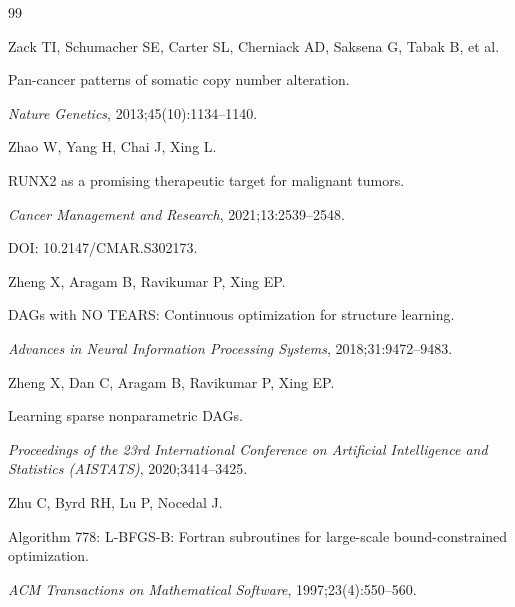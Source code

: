 \documentclass[12pt,a4paper]{article}
\begin{document}
\begin{thebibliography}{99}

Zack TI, Schumacher SE, Carter SL, Cherniack AD, Saksena G, Tabak B, et al.




Pan-cancer patterns of somatic copy number alteration.




\textit{Nature Genetics}, 2013;45(10):1134--1140.




Zhao W, Yang H, Chai J, Xing L.


RUNX2 as a promising therapeutic target for malignant tumors.


\textit{Cancer Management and Research}, 2021;13:2539--2548.


DOI: 10.2147/CMAR.S302173.




Zheng X, Aragam B, Ravikumar P, Xing EP.




DAGs with NO TEARS: Continuous optimization for structure learning.




\textit{Advances in Neural Information Processing Systems}, 2018;31:9472--9483.




Zheng X, Dan C, Aragam B, Ravikumar P, Xing EP.




Learning sparse nonparametric DAGs.




\textit{Proceedings of the 23rd International Conference on Artificial Intelligence and Statistics (AISTATS)}, 2020;3414--3425.




Zhu C, Byrd RH, Lu P, Nocedal J.




Algorithm 778: L-BFGS-B: Fortran subroutines for large-scale bound-constrained optimization.




\textit{ACM Transactions on Mathematical Software}, 1997;23(4):550--560.



\end{thebibliography}
\end{document}
